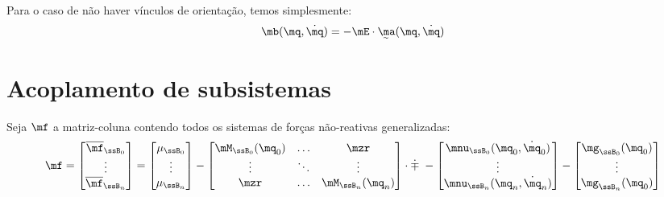 \documentclass[]{politex}
\begin{document}
Para o caso de não haver vínculos de orientação, temos simplesmente:
\begin{equation}
\mb(\mq,\dot{\mq}) =-\mE \cdot \underaccent{\sim}{\ma}(\mq, \dot{\mq})
\end{equation}

\section{Acoplamento de subsistemas} 

Seja $\mf$ a matriz-coluna contendo todos os sistemas de forças não-reativas generalizadas:
\begin{equation} \label{eq:fParalelos}
\mf = 
\begin{bmatrix}
\overline{\mf}_{\ssB_0} \\
\vdots \\
\overline{\mf}_{\ssB_n}  
\end{bmatrix}
=
\begin{bmatrix}
\mu_{\ssB_0} \\
\vdots \\
\mu_{\ssB_n} 
\end{bmatrix}
-
\begin{bmatrix}
\mM_{\ssB_0}(\mq_0) & \ldots & \mzr\\
\vdots & \ddots & \vdots\\
\mzr &\ldots  & \mM_{\ssB_n}(\mq_n)
\end{bmatrix}
\cdot
\dot{\mp} \;
-
\begin{bmatrix}
\mnu_{\ssB_0}(\mq_0,\dot{\mq}_0) \\
\vdots \\
\mnu_{\ssB_n}(\mq_n,\dot{\mq}_n)  
\end{bmatrix}
-
\begin{bmatrix}
\mg_{\ssB_0}(\mq_0) \\
\vdots \\
\mg_{\ssB_n}(\mq_0)  
\end{bmatrix}
\end{equation}
\end{document}
